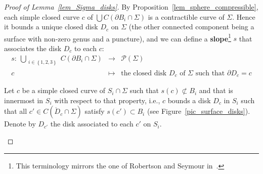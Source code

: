 \documentclass[11pt,a4paper]{article}
\newcommand\ens[1]{\left\{ #1 \right\}}
\newcommand\oper[4]{#1 \limits_{\substack{#2}}^{#3}{#4}}
\newcommand{\bfdex}[1]{\textbf{#1}\index{#1}}
\renewcommand{\P}{\mathcal{P}}
\begin{document}
\begin{proof}[Proof of Lemma~\ref{lem_Sigma_disks}]
 By Proposition~\ref{lem_sphere_compressible}, each simple closed curve $c$ of $\bigcup{C(\partial B_i \cap \Sigma)}$ is a contractible curve of $\Sigma$. Hence it bounds a unique closed disk $D_c$ on $\Sigma$ (the other connected component being a surface with non-zero genus and a puncture), and we can define a \bfdex{slope}\footnote{This terminology mirrors the one of Robertson and Seymour in~\cite{Graph_minors_XI}.} $s$ that associates the disk $D_c$ to each $c$:
\begin{equation*}
\begin{array}{rcl}
s:~\oper{\bigcup}{i \in \ens{1,2,3}}{}{C(\partial B_i \cap \Sigma)} & \rightarrow & \P(\Sigma)\\
 c & \mapsto & \text{the closed disk }D_c \text{ of $\Sigma$ such that } \partial D_c = c
\end{array}
\end{equation*}

  
Let $c$ be a simple closed curve of $S_i \cap \Sigma$ such that $s(c) \not \subset B_i$ and that is innermost in $S_i$ with respect to that property, i.e., $c$ bounds a disk $D_c$ in $S_i$ such that all $c' \in C(\mathring D_c \cap \Sigma)$ satisfy $s(c') \subset B_i$ (see Figure~\ref{pic_surface_disks}). Denote by $D_{c'}$ the disk associated to each $c'$ on $S_i$.

\begin{figure}[H]
\begin{center}
\end{center}
\end{figure}
\end{proof}
\end{document}
